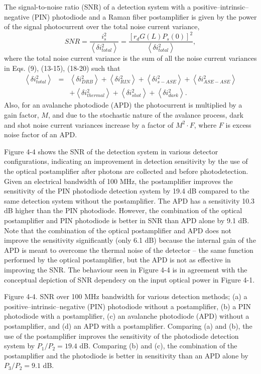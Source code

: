 The signal-to-noise ratio (SNR) of a detection system with a positive–intrinsic–negative (PIN) photodiode and a Raman fiber postamplifier is given by the power of the signal photocurrent over the total noise current variance,
\begin{equation}
{SNR} = \frac{i_s^2}{\left\langle \delta i_{total}^2\right\rangle}=\frac{[r_d G(L) P_s(0)]^2}{\left\langle \delta i_{total}^2\right\rangle},
\end{equation}
where the total noise current variance is the sum of all the noise current variances in Eqs. (9), (13-15), (18-20) such that
\begin{eqnarray}
\left\langle \delta i_{total}^2\right\rangle &=&\left\langle \delta i_{DRB}^2\right\rangle+\left\langle \delta i_{RIN}^2\right\rangle+\left\langle \delta i_{s-ASE}^2\right\rangle+\left\langle \delta i_{ASE-ASE}^2\right\rangle \nonumber\\
&&+\left\langle \delta i_{thermal}^2\right\rangle+\left\langle \delta i_{shot}^2\right\rangle+\left\langle \delta i_{dark}^2\right\rangle.
\end{eqnarray}
Also, for an avalanche photodiode (APD) the photocurrent is multiplied by a gain factor, $M$, and due to the stochastic nature of the avalance process, dark and shot noise current variances increase by a factor of $M^2 \cdot F$, where $F$ is excess noise factor of an APD.

Figure 4-4 shows the SNR of the detection system in various detector configurations, indicating an improvement in detection sensitivity by the use of the optical postamplifier after photons are collected and before photodetection. Given an electrical bandwidth of 100 MHz, the postamplifier improves the sensitivity of the PIN photodiode detection system by 19.4 dB compared to the same detection system without the postamplifier. The APD has a sensitivity 10.3 dB higher than the PIN photodiode. However, the combination of the optical postamplifier and PIN photodiode is better in SNR than APD alone by 9.1 dB. Note that the combination of the optical postamplifier and APD does not improve the sensitivity significantly (only 6.1 dB) because the internal gain of the APD is meant to overcome the thermal noise of the detector – the same function performed by the optical postamplifier, but the APD is not as effective in improving the SNR. The behaviour seen in Figure 4-4 is in agreement with the conceptual depiction of SNR dependecy on the input optical power in Figure 4-1.

Figure 4-4. SNR over 100 MHz bandwidth for various detection methods; (a) a positive–intrinsic–negative (PIN) photodiode without a postamplifier, (b) a PIN photodiode with a postamplifier, (c) an avalanche photodiode (APD) without a postamplifier, and (d) an APD with a postamplifier. Comparing (a) and (b), the use of the postamplifier improves the sensitivity of the photodiode detection system by $P_1/P_2 = 19.4$ dB. Comparing (b) and (c), the combination of the postamplifier and the photodiode is better in sensitivity than an APD alone by $P_3 / P_2 = 9.1$ dB.

